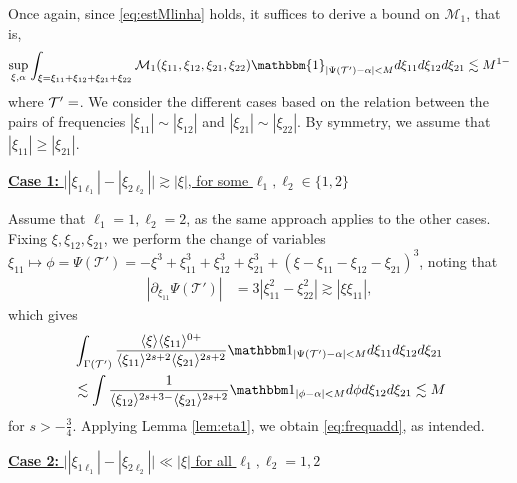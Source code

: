 \documentclass[a4paper,
11pt,  reqno]{amsart}
\makeatletter
\newcommand{\5}{\textup{V}}
\newcommand{\noi}{\noindent}
\newcommand{\ind}{\mathbbm 1}
\newcommand{\les}{\lesssim}
\theoremstyle{remark}
\newcommand{\TT}{\mathcal{T}}
\newcommand{\al}{\alpha}
\newcommand{\G}{\Gamma}
\renewcommand{\l}{\ell}
\newcommand{\ges}{\gtrsim}
\newcommand{\jb}[1]
{\langle #1 \rangle}
\newcommand{\M}{\mathcal{M}}
\def\<#1>{\csname MH@symb@#1\endcsname}
\numberwithin{equation}{section}
\numberwithin{theorem}{section}
\makeatother
\begin{document}
Once again, since \eqref{eq:estMlinha} holds, it suffices to derive a bound on $\M_1$, that is,
\begin{align}\label{eq:frequadd}
    \sup_{\xi, \al}
\int_{\xi=\xi_{11} + \xi_{12} + \xi_{21} + \xi_{22}} \mathcal{M}_1(\xi_{11}, \xi_{12}, \xi_{21}, \xi_{22}) \mathbbm{1}_{|\Psi(\TT')-\alpha|<M}d\xi_{11}d\xi_{12}d\xi_{21}
\les M^{1-}
\end{align}
where $\TT'=\<33>$.
We consider the different cases based on the relation between the pairs of frequencies $|\xi_{11}|\sim |\xi_{12}|$ and $|\xi_{21}| \sim |\xi_{22}|$. By symmetry, we assume that $|\xi_{11}| \ge|\xi_{21}|$.

\smallskip
\noi
\underline{\textbf{Case 1:} $\big||\xi_{1 \l_1}|-|\xi_{2\l_2}|\big| \ges |\xi|$, for some $\l_1,\l_2\in\{1,2\}$}

Assume that $\l_1 = 1,\l_2=2$, as the same approach applies to the other cases.
Fixing $\xi, \xi_{12},\xi_{21}$, we perform the change of variables
$
\xi_{11} \mapsto \phi = \Psi(\TT')
= - \xi^3 +  \xi_{11}^3 +  \xi_{12}^3 +  \xi_{21}^3 +  (\xi-\xi_{11}-\xi_{12}-\xi_{21})^3$,
noting that
\begin{align}\label{CV1}
|\partial_{\xi_{11}} \Psi(\TT') |
& = 3|\xi_{11}^2-\xi_{22}^2| \gtrsim |\xi \xi_{11}|,
\end{align}
which gives
\begin{align}
&
\int_{\G(\TT')}
\frac{\jb{\xi} \jb{\xi_{11}}^{0+}  }{\jb{\xi_{11}}^{2s+2} \jb{\xi_{21}}^{2s+2} } \ind_{| \Psi(\TT') - \al | < M } d\xi_{11} d\xi_{12} d\xi_{21}
\\
&
\les \int \frac{1}{\jb{\xi_{12}}^{2s+3-} \jb{\xi_{21}}^{2s+2}} \ind_{| \phi - \al  | < M } d\phi d\xi_{12} d\xi_{21}
\les M
\end{align}
for $s>-\frac34$. Applying Lemma \ref{lem:eta1}, we obtain  \eqref{eq:frequadd}, as intended.




\smallskip
\noi
\underline{\textbf{Case 2:} $ \big| |\xi_{1\l_1}| - |\xi_{2\l_2}| \big|\ll |\xi| $ for all $\l_1,\l_2=1,2$}
\end{document}
